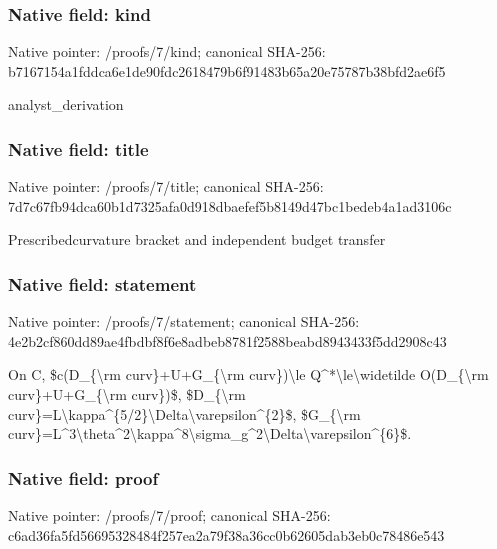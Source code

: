 \documentclass[10pt,a4paper]{article}
\begin{document}
\subsubsection{Native field: kind}


Native pointer: /proofs/7/kind; canonical SHA-256: b7167154a1fddca6e1de90fd\allowbreak{}c2618479b6f91483b65a20e7\allowbreak{}5787b38bfd2ae6f5


analyst\_derivation


\subsubsection{Native field: title}


Native pointer: /proofs/7/title; canonical SHA-256: 7d7c67fb94dca60b1d7325af\allowbreak{}a0d918dbaefef5b8149d47bc\allowbreak{}1bedeb4a1ad3106c


Prescribedcurvature bracket and independent budget transfer


\subsubsection{Native field: statement}


Native pointer: /proofs/7/statement; canonical SHA-256: 4e2b2cf860dd89ae4fbdbf8f\allowbreak{}6e8adbeb8781f2588beabd89\allowbreak{}43433f5dd2908c43


On C, \$c(D\_\{\textbackslash{}rm curv\}+U+G\_\{\textbackslash{}rm curv\})\textbackslash{}le Q\textasciicircum{}*\textbackslash{}le\textbackslash{}widetilde O(D\_\{\textbackslash{}rm curv\}+U+G\_\{\textbackslash{}rm curv\})\$, \$D\_\{\textbackslash{}rm curv\}=L\textbackslash{}kappa\textasciicircum{}\{5/2\}\textbackslash{}Delt\allowbreak{}a\textbackslash{}varepsilon\textasciicircum{}\{2\}\$, \$G\_\{\textbackslash{}rm curv\}=L\textasciicircum{}3\textbackslash{}theta\textasciicircum{}2\textbackslash{}kappa\textasciicircum{}\allowbreak{}8\textbackslash{}sigma\_g\textasciicircum{}2\textbackslash{}Delta\textbackslash{}vareps\allowbreak{}ilon\textasciicircum{}\{6\}\$.


\subsubsection{Native field: proof}


Native pointer: /proofs/7/proof; canonical SHA-256: c6ad36fa5fd56695328484f2\allowbreak{}57ea2a79f38a36cc0b62605d\allowbreak{}ab3eb0c78486e543
\end{document}
